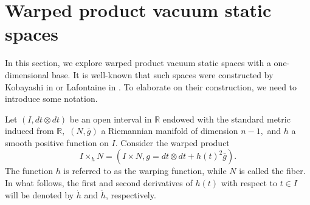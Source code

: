 \documentclass[10pt,leqno,oneside]{amsart}
\begin{document}
{\section{Warped product vacuum static spaces}

             In this section, we explore warped product vacuum static spaces with a one-dimensional base. It is well-known that such spaces were constructed by Kobayashi in \cite[Lemma 1.1]{Kobayashi1982} or Lafontaine in \cite[Theorem C1]{Lafontaine1983}. To elaborate on their construction, we need to introduce some notation.

             Let $(I, dt\otimes dt)$ be an open interval in $\mathbb{R}$ endowed with the standard metric induced from $\mathbb{R},$ $(N, \bar{g})$ a Riemannian manifold of dimension $n-1,$ and  $h$ a smooth positive function on $I.$ Consider the warped product
             $$I\times_hN =(I\times N, g=dt\otimes dt+h(t)^2\bar{g}).$$
             The function $h$ is referred to as the warping function, while \(N\) is called the fiber. In what follows, the first and second derivatives of $h(t)$ with respect to $t\in I$ will be denoted by $\dot{h}$ and $\ddot{h}$, respectively.

}
\end{document}
